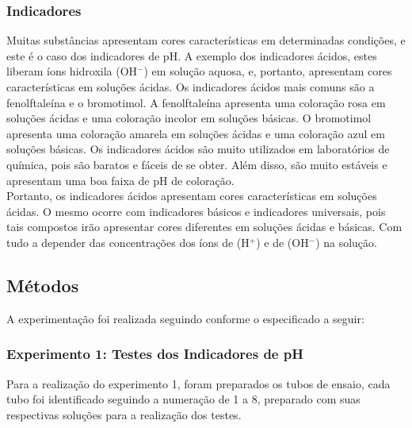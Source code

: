     \subsubsection{Indicadores}\label{subsubsec:mat_materiais_indicadores}
    \indent Muitas substâncias apresentam cores características em determinadas condições, e este é o caso dos indicadores de pH. A exemplo dos indicadores ácidos, estes liberam íons hidroxila (OH$^-$) em solução aquosa, e, portanto, apresentam cores características em soluções ácidas.
    Os indicadores ácidos mais comuns são a fenolftaleína e o bromotimol.
    A fenolftaleína apresenta uma coloração rosa em soluções ácidas e uma coloração incolor em soluções básicas.
    O bromotimol apresenta uma coloração amarela em soluções ácidas e uma coloração azul em soluções básicas.
    Os indicadores ácidos são muito utilizados em laboratórios de química, pois são baratos e fáceis de se obter.
    Além disso, são muito estáveis e apresentam uma boa faixa de pH de coloração.\\
    Portanto, os indicadores ácidos apresentam cores características em soluções ácidas.
    O mesmo ocorre com indicadores básicos e indicadores universais, pois tais compostos irão apresentar cores diferentes em soluções ácidas e básicas.
    Com tudo a depender das concentrações dos íons de (H$^+$) e de (OH$^-$) na solução.

    \subsection{Métodos}\label{subsec:mat_metodos}
        \indent A experimentação foi realizada seguindo conforme o especificado a seguir:

    \subsubsection{Experimento 1: Testes dos Indicadores de pH}\label{subsubsec:mat_metodos_exp1}
        \indent Para a realização do experimento 1, foram preparados os tubos de ensaio, cada tubo foi identificado seguindo a numeração de 1 a 8, preparado com suas respectivas soluções para a realização dos testes.\\

